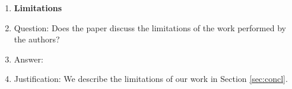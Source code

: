 \documentclass{article}
\begin{document}
\begin{enumerate}
\item {\bf Limitations}
    \item[] Question: Does the paper discuss the limitations of the work performed by the authors?
    \item[] Answer: \answerYes{} %
    \item[] Justification: We describe the limitations of our work in Section \ref{sec:concl}.


\end{enumerate}
\end{document}
